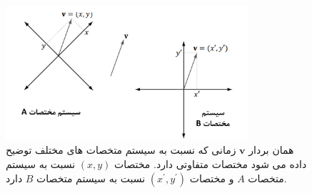 {\begin{spacing}{1.5}
        \begin{figure}[H]
            \centering
            \setlength{\belowcaptionskip}{-10pt}
            \includegraphics[width=0.8\textwidth]{Images/4/3/4.Session.1.3.10}
            \caption {همان بردار $\textbf{v}$ زمانی که نسبت به سیستم متخصات های مختلف توضیح داده می شود مختصات متفاوتی دارد. مختصات $(x, y)$ نسبت به سیستم متخصات $A$ و مختصات $(x^\prime, y^\prime)$ نسبت به سیستم متخصات $B$ دارد.}
            \label{fig:4.Session.1.3.10}
        \end{figure}
    \end{spacing}
}

